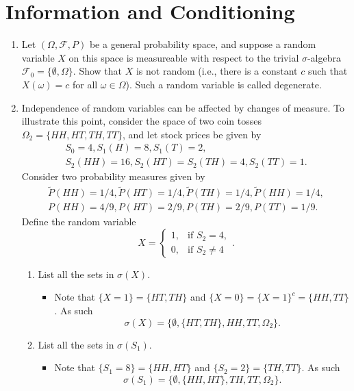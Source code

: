 \documentclass{article}
\newcommand{\F}{\mathcal{F}}
\begin{document}
\section{Information and Conditioning}
\begin{enumerate}
	\item Let $(\Omega, \F, P)$ be a general probability space, and suppose a random variable $X$ on this space is measureable with respect to the trivial $\sigma$-algebra $\mathcal{F}_0 = \{\emptyset, \Omega\}$. Show that $X$ is not random (i.e., there is a constant $c$ such that $X(\omega) = c$ for all $\omega \in \Omega$). Such a random variable is called degenerate.
	\item Independence of random variables can be affected by changes of measure. To illustrate this point, consider the space of two coin tosses $\Omega_2 = \{HH, HT, TH, TT\}$, and let stock prices be given  by
	$$
	\begin{aligned}
	S_0 = 4, S_1(H) = 8, S_1(T) = 2, \\
	S_2(HH) = 16, S_2(HT) = S_2(TH) = 4, S_2(TT) = 1.
	\end{aligned}
	$$
	Consider two probability measures given by
	$$
	\begin{aligned}
	\tilde{P}(HH) = 1/4, \tilde{P}(HT) = 1/4, \tilde{P}(TH) = 1/4, \tilde{P}(HH) = 1/4, \\
	P(HH) = 4/9, P(HT) = 2/9, P(TH) = 2/9, P(TT) = 1/9.
	\end{aligned}
	$$
	Define the random variable
	$$
	X =
	\begin{cases}
		1,&\text{if }S_2 = 4,\\
		0,&\text{if }S_2 \neq 4
	\end{cases}.
	$$
		\begin{enumerate}
			\item List all the sets in $\sigma(X)$.
				\begin{itemize}
					\item Note that $\{X = 1\} = \{HT, TH\}$ and $\{X = 0\} = \{X = 1\}^c = \{HH, TT\}$. As such
					$$
					\sigma(X) = \{\emptyset, \{HT, TH\}, {HH, TT}, \Omega_2\}.
					$$
				\end{itemize}
			\item List all the sets in $\sigma(S_1)$.
				\begin{itemize}
					\item Note that $\{S_1 = 8\} = \{HH, HT\}$ and $\{S_2 = 2\} = \{TH, TT\}$. As such
					$$
					\sigma(S_1) = \{\emptyset, \{HH, HT\}, {TH, TT}, \Omega_2\}.
					$$
				\end{itemize}

\end{enumerate}
\end{enumerate}
\end{document}
